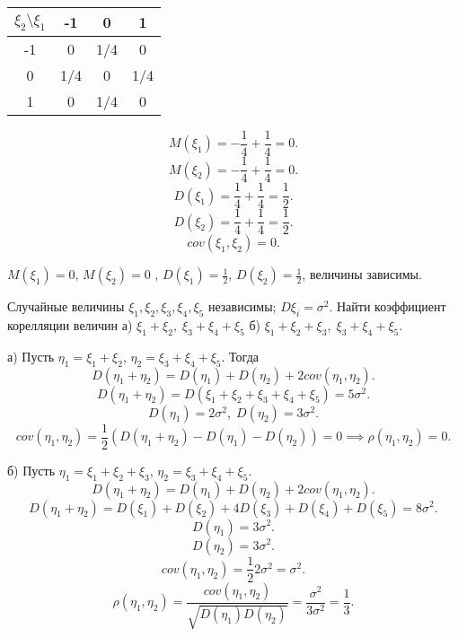\begin{solution}
\par\medskip
\begin{tabular}{|c|c|c|c|}
  \hline
  $\xi_2  \setminus \xi_1$ & -1 & 0 & 1 \\
  \hline
  -1 & 0 & 1/4 & 0 \\
  \hline
  0 & 1/4 & 0 & 1/4 \\
  \hline
  1 & 0 & 1/4 & 0 \\
  \hline
\end{tabular}
\[
  M(\xi_1) = -\frac{1}{4} + \frac{1}{4} = 0
.\] 
\[
  M(\xi_2) = -\frac{1}{4} + \frac{1}{4} = 0
.\] 
\[
D(\xi_1) = \frac{1}{4} + \frac{1}{4} = \frac{1}{2}
.\] 
\[
D(\xi_2) = \frac{1}{4} + \frac{1}{4} = \frac{1}{2}
.\] 
\[
cov(\xi_1, \xi_2) = 0
.\] 

\end{solution}

\begin{result}
$M(\xi_1) = 0$, $M(\xi_2) = 0$ , $D(\xi_1) = \frac{1}{2}$, $D(\xi_2) = \frac{1}{2}$, величины
зависимы. 
\end{result}

\medskip
\begin{task}{11}
  Случайные величины $\xi_1, \xi_2,\xi_3, \xi_4,\xi_5$ независимы; $D\xi_i = \sigma^2$. Найти 
  коэффициент корелляции величин а) $\xi_1 + \xi_2, \; \xi_3+\xi_4+\xi_5$ б) $\xi_1 +\xi_2+\xi_3, \;
  \xi_3 +\xi_4+\xi_5$. 
\end{task}

\begin{subtask}{а)}
  Пусть $\eta_1 = \xi_1 + \xi_2$, $\eta_2 = \xi_3 + \xi_4 + \xi_5$. Тогда \[
  D(\eta_1 + \eta_2) = D(\eta_1) + D(\eta_2) + 2 cov(\eta_1, \eta_2)
  .\] 
  \[
  D(\eta_1 + \eta_2) = D(\xi_1 + \xi_2 + \xi_3 + \xi_4 + \xi_5) = 5 \sigma^2
  .\] 
  \[
  D(\eta_1) = 2 \sigma^2, \; D(\eta_2) = 3 \sigma^2
  .\] 
  \[
  cov(\eta_1, \eta_2) = \frac{1}{2} \left(D(\eta_1 + \eta_2) - D(\eta_1) - D(\eta_2)\right) = 0
  \implies \rho(\eta_1, \eta_2) = 0
  .\] 
\end{subtask}

\begin{subtask}{б)}
Пусть $\eta_1 = \xi_1 + \xi_2 + \xi_3$, $\eta_2 = \xi_3 + \xi_4 + \xi_5$.
\[
D(\eta_1 + \eta_2) = D(\eta_1) + D(\eta_2) + 2 cov(\eta_1, \eta_2)
.\] 
\[
D(\eta_1 + \eta_2) = D(\xi_1) + D(\xi_2) + 4 D(\xi_3) + D(\xi_4) + D(\xi_5) = 8 \sigma^2
.\] 
\[
D(\eta_1) = 3 \sigma^2
.\] 
\[
D(\eta_2) = 3 \sigma^2
.\] 
\[
cov(\eta_1, \eta_2) = \frac{1}{2} 2 \sigma^2 = \sigma^2
.\] 
\[
\rho(\eta_1, \eta_2) = \frac{cov(\eta_1, \eta_2)}{\sqrt{D(\eta_1) D(\eta_2)} } =
\frac{\sigma^2}{3\sigma^2} = \frac{1}{3}
.\] 
\end{subtask}

